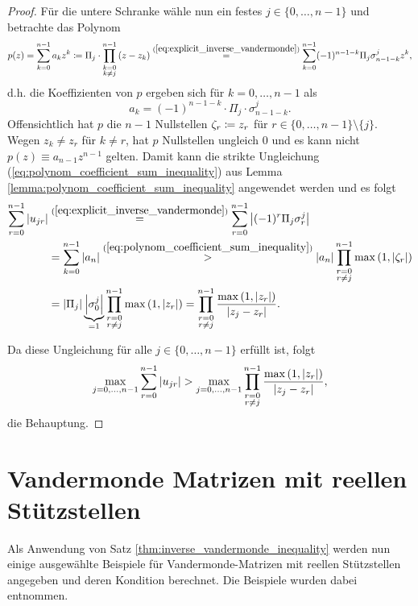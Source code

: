 \begin{proof}
    \noindent Für die untere Schranke wähle nun ein festes
    $j \in \{0, \dots, n-1\}$ und betrachte das Polynom
    \[
        p(z) = \sum_{k=0}^{n-1} a_k z^k
        \coloneqq \Pi_j \cdot \prod_{\substack{k=0\\ k \neq j}}^{n-1} \left( z - z_k \right)
        \overset{(\ref{eq:explicit_inverse_vandermonde})}{=} \sum_{k=0}^{n-1} (-1)^{n-1-k} \Pi_j \sigma_{n-1-k}^j z^k,
    \]
    d.h. die Koeffizienten von $p$ ergeben sich für $k = 0, \dots, n-1$ als
    \[
        a_k = (-1)^{n-1-k} \cdot \Pi_j \cdot \sigma_{n-1-k}^j.
    \]
    Offensichtlich hat $p$ die $n-1$ Nullstellen
    $\zeta_r \coloneqq z_r$ für $r \in \{0,\dots,n-1\} \setminus \{j\}$.
    Wegen $z_k \neq z_r$ für $k \neq r$, hat $p$ Nullstellen ungleich $0$ und
    es kann nicht $p(z) \equiv a_{n-1} z^{n-1}$ gelten.
    Damit kann die strikte Ungleichung
    (\ref{eq:polynom_coefficient_sum_inequality}) aus Lemma
    \ref{lemma:polynom_coefficient_sum_inequality} angewendet werden und es
    folgt
    \[
        \begin{split}
            \sum_{r=0}^{n-1} \left\lvert u_{jr} \right\rvert
            &\overset{(\ref{eq:explicit_inverse_vandermonde})}{=}
                \sum_{r=0}^{n-1} \left\lvert (-1)^r \Pi_j \sigma_r^j \right\rvert\\
            &= \sum_{k=0}^{n-1} \left\lvert a_n \right\rvert
            \overset{(\ref{eq:polynom_coefficient_sum_inequality})}{>}
                \left\lvert a_{n} \right\rvert \prod_{\substack{r=0\\ r \neq j}}^{n-1} \max \left(1, \left\lvert \zeta_r \right\rvert \right)\\
            &= \left\lvert \Pi_j \right\rvert \underbrace{\left\lvert \sigma_0^j \right\rvert}_{=1} \prod_{\substack{r=0\\ r \neq j}}^{n-1} \max \left(1, \left\lvert z_r \right\rvert \right)
            = \prod_{\substack{r=0\\ r \neq j}}^{n-1} \frac{\max \left(1, \left\lvert z_r \right\rvert \right)}{\left\lvert z_j - z_r \right\rvert}.
        \end{split}
    \]

    \noindent Da diese Ungleichung für alle $j \in \{0, \dots, n-1\}$ erfüllt ist, folgt
    \[
        \max_{j = 0, \dots, n-1} \sum_{r=0}^{n-1} \left\lvert u_{jr} \right\rvert
        > \max_{j = 0, \dots, n-1} \prod_{\substack{r=0\\ r \neq j}}^{n-1} \frac{\max \left(1, \left\lvert z_r \right\rvert \right)}{\left\lvert z_j - z_r \right\rvert},
    \]
    die Behauptung.
\end{proof}

\section{Vandermonde Matrizen mit reellen Stützstellen}
Als Anwendung von Satz \ref{thm:inverse_vandermonde_inequality} werden nun
einige ausgewählte Beispiele für Vandermonde-Matrizen mit reellen Stützstellen
angegeben und deren Kondition berechnet.
Die Beispiele wurden dabei \cite[S. 197-199]{gautschi1} entnommen.


